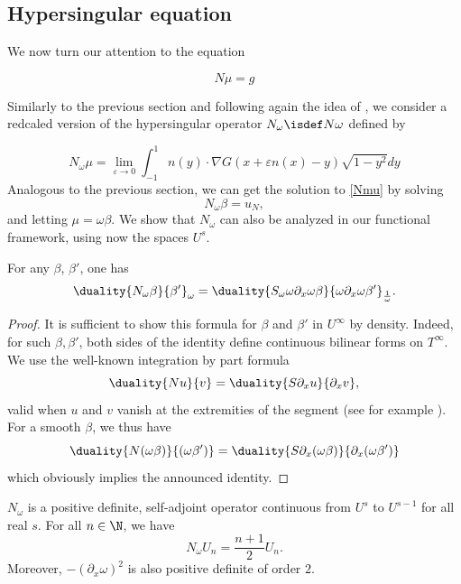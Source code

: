 \documentclass[a4paper]{article}
\begin{document}
	\subsection{Hypersingular equation} 
	
	We now turn our attention to the equation 
	
	\begin{equation}
	N\mu = g
	\label{Nmu}
	\end{equation} 
	
	Similarly to the previous section and following again the idea of \cite{bruno2012second}, we consider a redcaled version of the hypersingular operator $N_\omega \isdef N \omega$ defined by
	
	\[N_\omega \mu = \lim_{\varepsilon\to 0}\int_{-1}^{1} n(y)\cdot\nabla G(x + \varepsilon n(x) - y) \sqrt{1-y^2} dy\]
	Analogous to the previous section, we can get the solution to \eqref{Nmu} by solving 
	\begin{equation}
	N_\omega \beta = u_N,
	\label{Nomegabeta}
	\end{equation}
	and letting $\mu = \omega \beta$. 
	We show that $N_\omega$ can also be analyzed in our functional framework, using now the spaces $U^s$. 
	\begin{Lem}
		\label{lemIPP}
		For any $\beta$, $\beta'$, one has 
		\[\duality{N_\omega \beta}{ \beta'}_\omega = \duality{S_\omega \omega \partial_x \omega \beta}{\omega \partial_x \omega \beta'}_\frac{1}{\omega}.\]
		\begin{proof}
			It is sufficient to show this formula for $\beta$ and $\beta'$ in $U^{\infty}$ by density. Indeed, for such $\beta, \beta'$, both sides of the identity define continuous bilinear forms on $T^{\infty}$. We use the well-known integration by part formula
			\[\duality{N u}{v} = \duality{S\partial_x u}{\partial_x v},\]
			valid when $u$ and $v$ vanish at the extremities of the segment (see for example \cite{bruno2012second}). 
			For a smooth $\beta$, we thus have
			\[ \duality{N (\omega \beta)}{ (\omega \beta')} = \duality{S \partial_x(\omega \beta)}{\partial_x (\omega \beta')}\] 
			which obviously implies the announced identity. 
		\end{proof}
	\end{Lem}
	\begin{Prop}
		$N_\omega$ is a positive definite, self-adjoint operator continuous from $U^s$ to $U^{s-1}$ for all real $s$. For all $n \in \N$, we have 
		\[N_\omega U_n = \frac{n+1}{2}U_n.\]
		Moreover, $-(\partial_x\omega)^2$ is also positive definite of order $2$.
		\label{NUn}
	\end{Prop}
\end{document}
